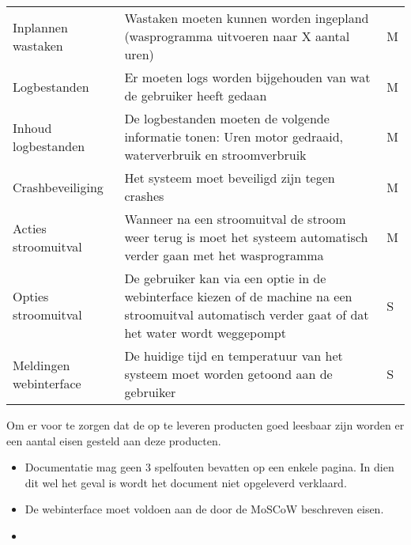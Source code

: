 \begin{longtable}{ p{3cm} p{7cm} l }
Inplannen wastaken & Wastaken moeten kunnen worden ingepland (wasprogramma uitvoeren naar X aantal uren) & M \\
Logbestanden & Er moeten logs worden bijgehouden van wat de gebruiker heeft gedaan & M \\
Inhoud logbestanden & De logbestanden moeten de volgende informatie tonen: Uren motor gedraaid, waterverbruik en stroomverbruik & M \\
Crashbeveiliging & Het systeem moet beveiligd zijn tegen crashes & M \\
Acties stroomuitval & Wanneer na een stroomuitval de stroom weer terug is moet het systeem automatisch verder gaan met het wasprogramma & M \\
Opties stroomuitval & De gebruiker kan via een optie in de webinterface kiezen of de machine na een stroomuitval automatisch verder gaat of dat het water wordt weggepompt & S \\
Meldingen webinterface & De huidige tijd en temperatuur van het systeem moet worden getoond aan de gebruiker & S \\
\end{longtable}



\subtitle{Kwaliteitseisen op te leveren producten}
Om er voor te zorgen dat de op te leveren producten goed leesbaar zijn worden er een aantal eisen gesteld aan deze producten.

\begin{itemize}
	\item Documentatie mag geen 3 spelfouten bevatten op een enkele pagina. In dien dit wel het geval is wordt het document niet opgeleverd verklaard.
	\item De webinterface moet voldoen aan de door de MoSCoW beschreven eisen.
	\item 
\end{itemize}

